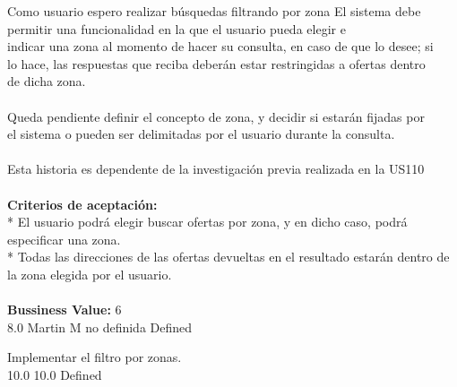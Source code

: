 	{Como usuario espero realizar búsquedas filtrando por zona} %
	{El sistema debe permitir una funcionalidad en la que el usuario pueda elegir e\\
indicar una zona al momento de hacer su consulta, en caso de que lo desee; si\\
lo hace, las respuestas que reciba deberán estar restringidas a ofertas dentro\\
de dicha zona.\\
  \\
Queda pendiente definir el concepto de zona, y decidir si estarán fijadas por\\
el sistema o pueden ser delimitadas por el usuario durante la consulta.\\
  \\
Esta historia es dependente de la investigación previa realizada en la US110\\
  \\
\textbf{Criterios de aceptación:}\\
* El usuario podrá elegir buscar ofertas por zona, y en dicho caso, podrá especificar una zona.  \\
* Todas las direcciones de las ofertas devueltas en el resultado estarán dentro de la zona elegida por el usuario.\\
  \\
\textbf{Bussiness Value:} 6\\
} %
	{} %
	{8.0} %
	{Martin M} %
	{no definida} %
	{Defined} %

		{Implementar el filtro por zonas.} %
		{\\
} %
		{10.0} %
		{} %
		{10.0} %
		{Defined} %


\vspace{20pt}


